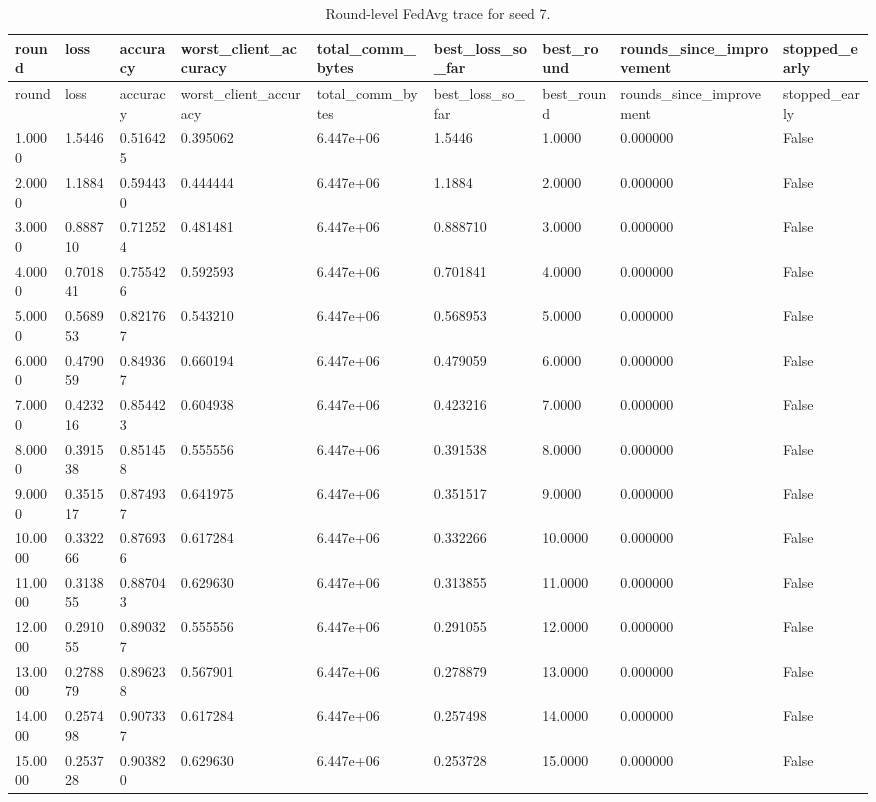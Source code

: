 \documentclass[11pt]{report}
\begin{document}
\begin{longtable}{lllllllll}
\caption{Round-level FedAvg trace for seed 7.}\\
\toprule
round & loss & accuracy & worst\_client\_accuracy & total\_comm\_bytes & best\_loss\_so\_far & best\_round & rounds\_since\_improvement & stopped\_early \\
\midrule
\endfirsthead
\toprule
round & loss & accuracy & worst\_client\_accuracy & total\_comm\_bytes & best\_loss\_so\_far & best\_round & rounds\_since\_improvement & stopped\_early \\
\midrule
\endhead
1.0000 & 1.5446 & 0.516425 & 0.395062 & 6.447e+06 & 1.5446 & 1.0000 & 0.000000 & False \\
2.0000 & 1.1884 & 0.594430 & 0.444444 & 6.447e+06 & 1.1884 & 2.0000 & 0.000000 & False \\
3.0000 & 0.888710 & 0.712524 & 0.481481 & 6.447e+06 & 0.888710 & 3.0000 & 0.000000 & False \\
4.0000 & 0.701841 & 0.755426 & 0.592593 & 6.447e+06 & 0.701841 & 4.0000 & 0.000000 & False \\
5.0000 & 0.568953 & 0.821767 & 0.543210 & 6.447e+06 & 0.568953 & 5.0000 & 0.000000 & False \\
6.0000 & 0.479059 & 0.849367 & 0.660194 & 6.447e+06 & 0.479059 & 6.0000 & 0.000000 & False \\
7.0000 & 0.423216 & 0.854423 & 0.604938 & 6.447e+06 & 0.423216 & 7.0000 & 0.000000 & False \\
8.0000 & 0.391538 & 0.851458 & 0.555556 & 6.447e+06 & 0.391538 & 8.0000 & 0.000000 & False \\
9.0000 & 0.351517 & 0.874937 & 0.641975 & 6.447e+06 & 0.351517 & 9.0000 & 0.000000 & False \\
10.0000 & 0.332266 & 0.876936 & 0.617284 & 6.447e+06 & 0.332266 & 10.0000 & 0.000000 & False \\
11.0000 & 0.313855 & 0.887043 & 0.629630 & 6.447e+06 & 0.313855 & 11.0000 & 0.000000 & False \\
12.0000 & 0.291055 & 0.890327 & 0.555556 & 6.447e+06 & 0.291055 & 12.0000 & 0.000000 & False \\
13.0000 & 0.278879 & 0.896238 & 0.567901 & 6.447e+06 & 0.278879 & 13.0000 & 0.000000 & False \\
14.0000 & 0.257498 & 0.907337 & 0.617284 & 6.447e+06 & 0.257498 & 14.0000 & 0.000000 & False \\
15.0000 & 0.253728 & 0.903820 & 0.629630 & 6.447e+06 & 0.253728 & 15.0000 & 0.000000 & False \\

\end{longtable}
\end{document}
